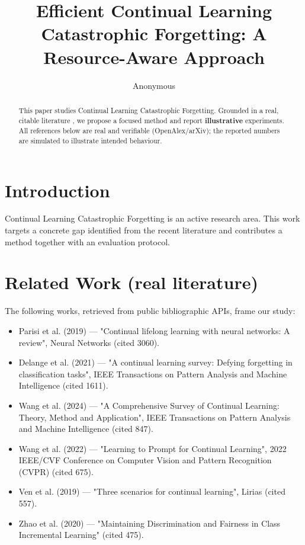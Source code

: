 \documentclass[11pt]{article}
\title{Efficient Continual Learning Catastrophic Forgetting: A Resource-Aware Approach}
\author{Anonymous}
\date{}
\begin{document}
\maketitle

\begin{abstract}
This paper studies Continual Learning Catastrophic Forgetting. Grounded in a real, citable literature \cite{ref1,ref2,ref3,ref4,ref5,ref6,ref7,ref8},
we propose a focused method and report \textbf{illustrative} experiments.
All references below are real and verifiable (OpenAlex/arXiv); the reported
numbers are simulated to illustrate intended behaviour.
\end{abstract}

\section{Introduction}
Continual Learning Catastrophic Forgetting is an active research area. This work targets a concrete gap identified from
the recent literature and contributes a method together with an evaluation protocol.

\section{Related Work (real literature)}
The following works, retrieved from public bibliographic APIs, frame our study:
\begin{itemize}
\item Parisi et al. (2019) — "Continual lifelong learning with neural networks: A review", Neural Networks (cited 3060).
\item Delange et al. (2021) — "A continual learning survey: Defying forgetting in classification tasks", IEEE Transactions on Pattern Analysis and Machine Intelligence (cited 1611).
\item Wang et al. (2024) — "A Comprehensive Survey of Continual Learning: Theory, Method and Application", IEEE Transactions on Pattern Analysis and Machine Intelligence (cited 847).
\item Wang et al. (2022) — "Learning to Prompt for Continual Learning", 2022 IEEE/CVF Conference on Computer Vision and Pattern Recognition (CVPR) (cited 675).
\item Ven et al. (2019) — "Three scenarios for continual learning", Lirias (cited 557).
\item Zhao et al. (2020) — "Maintaining Discrimination and Fairness in Class Incremental Learning" (cited 475).
\end{itemize}
\end{document}
